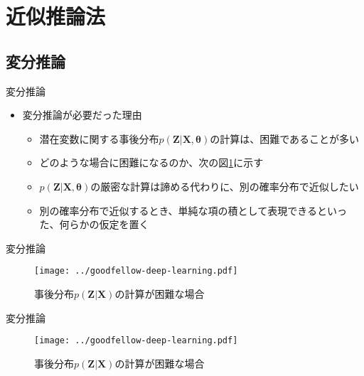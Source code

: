\documentclass[dvipdfmx,notheorems,t]{beamer}
\begin{document}
\section{近似推論法}

\subsection{変分推論}

\begin{frame}{変分推論}

\begin{itemize}
	\item 変分推論が必要だった理由
	\begin{itemize}
		\item 潜在変数に関する事後分布$p(\bm{Z} | \bm{X}, \bm{\theta})$の計算は、困難であることが多い
		\item どのような場合に困難になるのか、次の図\ref{fig:example-of-inference-problems}に示す
		\newline
		\item $p(\bm{Z} | \bm{X}, \bm{\theta})$の厳密な計算は諦める代わりに、\alert{別の確率分布で近似}したい
		\newline
		\item 別の確率分布で近似するとき、単純な項の積として表現できるといった、\alert{何らかの仮定を置く}
	\end{itemize}
\end{itemize}

\end{frame}

\begin{frame}{変分推論}

\begin{figure}[h]
	\centering
	\texttt{[image: ../goodfellow-deep-learning.pdf]}
	\caption{事後分布$p(\bm{Z} | \bm{X})$の計算が困難な場合}
	\label{fig:example-of-inference-problems}
\end{figure}

\end{frame}

\begin{frame}{変分推論}

\begin{figure}[h]
	\centering
	\texttt{[image: ../goodfellow-deep-learning.pdf]}
	\caption{事後分布$p(\bm{Z} | \bm{X})$の計算が困難な場合}
	\label{fig:example-of-inference-problems-2}
\end{figure}

\end{frame}
\end{document}

